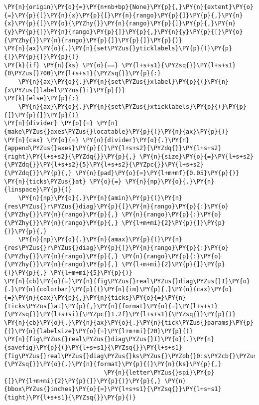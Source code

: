 \begin{Verbatim}[commandchars=\\\{\}]
        \PY{n}{origin}\PY{o}{=}\PY{n+nb+bp}{None}\PY{p}{,}\PY{n}{extent}\PY{o}{=}\PY{p}{[}\PY{n}{x}\PY{p}{[}\PY{n}{rango}\PY{p}{]}\PY{p}{,}\PY{n}{x}\PY{p}{[}\PY{o}{\PYZhy{}}\PY{n}{rango}\PY{p}{]}\PY{p}{,}\PY{n}{y}\PY{p}{[}\PY{n}{rango}\PY{p}{]}\PY{p}{,}\PY{n}{y}\PY{p}{[}\PY{o}{\PYZhy{}}\PY{n}{rango}\PY{p}{]}\PY{p}{]}\PY{p}{)}
\PY{n}{ax}\PY{o}{.}\PY{n}{set\PYZus{}yticklabels}\PY{p}{(}\PY{p}{[}\PY{p}{]}\PY{p}{)}
\PY{k}{if} \PY{n}{ks} \PY{o}{==} \PY{l+s+s1}{\PYZsq{}}\PY{l+s+s1}{0\PYZus{}700}\PY{l+s+s1}{\PYZsq{}}\PY{p}{:}
    \PY{n}{ax}\PY{o}{.}\PY{n}{set\PYZus{}xlabel}\PY{p}{(}\PY{n}{x\PYZus{}label\PYZus{}i}\PY{p}{)}
\PY{k}{else}\PY{p}{:}
    \PY{n}{ax}\PY{o}{.}\PY{n}{set\PYZus{}xticklabels}\PY{p}{(}\PY{p}{[}\PY{p}{]}\PY{p}{)}
\PY{n}{divider} \PY{o}{=} \PY{n}{make\PYZus{}axes\PYZus{}locatable}\PY{p}{(}\PY{n}{ax}\PY{p}{)}
\PY{n}{cax} \PY{o}{=} \PY{n}{divider}\PY{o}{.}\PY{n}{append\PYZus{}axes}\PY{p}{(}\PY{l+s+s2}{\PYZdq{}}\PY{l+s+s2}{right}\PY{l+s+s2}{\PYZdq{}}\PY{p}{,} \PY{n}{size}\PY{o}{=}\PY{l+s+s2}{\PYZdq{}}\PY{l+s+s2}{5}\PY{l+s+s2}{\PYZpc{}}\PY{l+s+s2}{\PYZdq{}}\PY{p}{,} \PY{n}{pad}\PY{o}{=}\PY{l+m+mf}{0.05}\PY{p}{)}
\PY{n}{ticks\PYZus{}at} \PY{o}{=} \PY{n}{np}\PY{o}{.}\PY{n}{linspace}\PY{p}{(}
    \PY{n}{np}\PY{o}{.}\PY{n}{amin}\PY{p}{(}\PY{n}{res\PYZus{}r\PYZus{}diag}\PY{p}{[}\PY{n}{rango}\PY{p}{:}\PY{o}{\PYZhy{}}\PY{n}{rango}\PY{p}{,} \PY{n}{rango}\PY{p}{:}\PY{o}{\PYZhy{}}\PY{n}{rango}\PY{p}{,} \PY{l+m+mi}{2}\PY{p}{]}\PY{p}{)}\PY{p}{,}
    \PY{n}{np}\PY{o}{.}\PY{n}{amax}\PY{p}{(}\PY{n}{res\PYZus{}r\PYZus{}diag}\PY{p}{[}\PY{n}{rango}\PY{p}{:}\PY{o}{\PYZhy{}}\PY{n}{rango}\PY{p}{,} \PY{n}{rango}\PY{p}{:}\PY{o}{\PYZhy{}}\PY{n}{rango}\PY{p}{,} \PY{l+m+mi}{2}\PY{p}{]}\PY{p}{)}\PY{p}{,} \PY{l+m+mi}{5}\PY{p}{)}
\PY{n}{cb}\PY{o}{=}\PY{n}{fig\PYZus{}real\PYZus{}diag\PYZus{}I}\PY{o}{.}\PY{n}{colorbar}\PY{p}{(}\PY{n}{im}\PY{p}{,}\PY{n}{cax}\PY{o}{=}\PY{n}{cax}\PY{p}{,}\PY{n}{ticks}\PY{o}{=}\PY{n}{ticks\PYZus{}at}\PY{p}{,}\PY{n}{format}\PY{o}{=}\PY{l+s+s1}{\PYZsq{}}\PY{l+s+si}{\PYZpc{}1.2f}\PY{l+s+s1}{\PYZsq{}}\PY{p}{)}
\PY{n}{cb}\PY{o}{.}\PY{n}{ax}\PY{o}{.}\PY{n}{tick\PYZus{}params}\PY{p}{(}\PY{n}{labelsize}\PY{o}{=}\PY{l+m+mi}{20}\PY{p}{)}
\PY{n}{fig\PYZus{}real\PYZus{}diag\PYZus{}I}\PY{o}{.}\PY{n}{savefig}\PY{p}{(}\PY{l+s+s1}{\PYZsq{}}\PY{l+s+s1}{fig\PYZus{}real\PYZus{}diag\PYZus{}ks\PYZus{}\PYZob{}0:s\PYZcb{}\PYZus{}\PYZob{}1:s\PYZcb{}}\PY{l+s+s1}{\PYZsq{}}\PY{o}{.}\PY{n}{format}\PY{p}{(}\PY{n}{ks}\PY{p}{,}
                            \PY{n}{letter\PYZus{}spi}\PY{p}{[}\PY{l+m+mi}{2}\PY{p}{]}\PY{p}{)}\PY{p}{,} \PY{n}{bbox\PYZus{}inches}\PY{o}{=}\PY{l+s+s1}{\PYZsq{}}\PY{l+s+s1}{tight}\PY{l+s+s1}{\PYZsq{}}\PY{p}{)}
\end{Verbatim}


